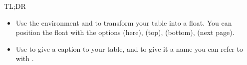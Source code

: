 \begin{infobox}{TL;DR}
	\begin{itemize}
		\item Use the environment  and  to transform your table into a float. You can position the float with the options  (here),  (top),  (bottom),  (next page).
		\item Use  to give a caption to your table, and  to give it a name you can refer to with .
	\end{itemize}
\end{infobox}
